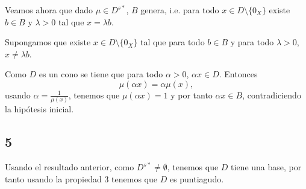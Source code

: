 Veamos ahora que dado $\mu \in D^{s*}$, $B$ genera,
i.e. para todo $x \in D \setminus \{ 0_X \}$ existe $b \in B$ y $\lambda > 0$ tal que $x = \lambda b$.

Supongamos que existe $x \in D \setminus \{ 0_X \}$ tal que para todo $b \in B$ y para todo $\lambda > 0$,
$x \neq \lambda b$.

Como $D$ es un cono se tiene que para todo $\alpha > 0$, $\alpha x \in D$.
Entonces
\begin{equation*}
    \mu(\alpha x) = \alpha \mu(x),
\end{equation*}
usando $\alpha = \frac{1}{\mu(x)}$,
tenemos que $\mu(\alpha x) = 1$ y por tanto $\alpha x \in B$,
contradiciendo la hipótesis inicial.

\subsection*{5}

Usando el resultado anterior, como $D^{s*} \neq \emptyset$,
tenemos que $D$ tiene una base,
por tanto usando la propiedad 3 tenemos que $D$ es puntiagudo.
